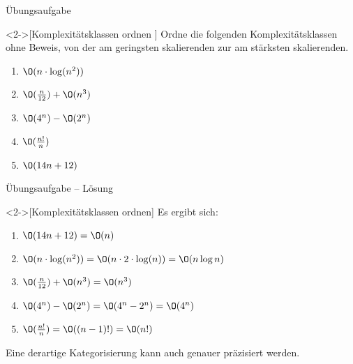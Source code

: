 \begin{frame}[fragile,c]{Übungsaufgabe}
    \begin{exercise}<2->[Komplexitätsklassen ordnen ]
        \pause{}Ordne die folgenden Komplexitätsklassen ohne Beweis, von der am geringsten skalierenden zur am stärksten skalierenden.\pause{}
        \begin{multicols}{3}
            \begin{enumerate}[<+(1)->]\widei
                \item \(\O(n \cdot \log(n^2))\)
                \item \(\O(\frac{n}{12}) + \O(n^3)\)
                \item \(\O(4^n)-\O(2^n)\)
                \item \(\O(\frac{n!}{n})\)
                \item \(\O(14n+12)\)
            \end{enumerate}
        \end{multicols}
    \end{exercise}
\end{frame}

\begin{frame}[fragile,c]{Übungsaufgabe -- Lösung}
    \begin{solve}<2->[Komplexitätsklassen ordnen]
        \pause{}Es ergibt sich: \begin{enumerate}[<+(1)->]
            \item \(\O(14n+12) = \O(n)\)
            \item \(\O(n \cdot \log(n^2)) = \O(n \cdot 2 \cdot \log(n)) = \O(n \log n)\)
            \item \(\O(\frac{n}{12}) + \O(n^3) = \O(n^3)\)
            \item \(\O(4^n) - \O(2^n) = \O(4^n - 2^n) = \O(4^n)\)
            \item \(\O(\frac{n!}{n}) = \O((n-1)!) = \O(n!)\)
        \end{enumerate}
        \pause{}Eine derartige Kategorisierung kann auch genauer präzisiert werden.
    \end{solve}
\end{frame}
\fi